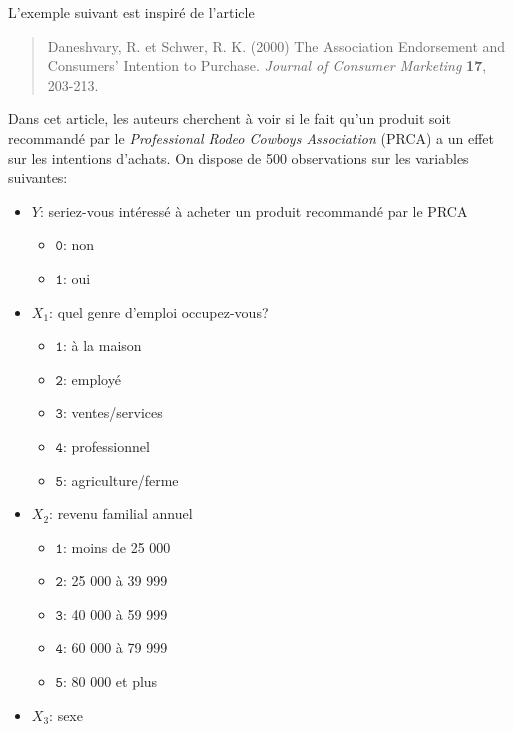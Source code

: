 \documentclass[
  11pt,
  letterpaper,
]{book}
\providecommand{\tightlist}{%
  \setlength{\itemsep}{0pt}\setlength{\parskip}{0pt}}
\theoremstyle{definition}
\theoremstyle{definition}
\theoremstyle{definition}
\theoremstyle{remark}
\begin{document}
L'exemple suivant est inspiré de l'article

\begin{quote}
Daneshvary, R. et Schwer, R. K. (2000) The Association Endorsement and Consumers' Intention to Purchase. \emph{Journal of Consumer Marketing} \textbf{17}, 203-213.
\end{quote}

Dans cet article, les auteurs cherchent à voir si le fait qu'un produit soit recommandé par le \emph{Professional Rodeo Cowboys Association} (PRCA) a un effet sur les intentions d'achats. On dispose de 500 observations sur les variables suivantes:

\begin{itemize}
\tightlist
\item
  \(Y\): seriez-vous intéressé à acheter un produit recommandé par le PRCA

  \begin{itemize}
  \tightlist
  \item
    \(\texttt{0}\): non
  \item
    \(\texttt{1}\): oui
  \end{itemize}
\item
  \(X_1\): quel genre d'emploi occupez-vous?

  \begin{itemize}
  \tightlist
  \item
    \(\texttt{1}\): à la maison
  \item
    \(\texttt{2}\): employé
  \item
    \(\texttt{3}\): ventes/services
  \item
    \(\texttt{4}\): professionnel
  \item
    \(\texttt{5}\): agriculture/ferme
  \end{itemize}
\item
  \(X_2\): revenu familial annuel

  \begin{itemize}
  \tightlist
  \item
    \(\texttt{1}\): moins de 25 000
  \item
    \(\texttt{2}\): 25 000 à 39 999
  \item
    \(\texttt{3}\): 40 000 à 59 999
  \item
    \(\texttt{4}\): 60 000 à 79 999
  \item
    \(\texttt{5}\): 80 000 et plus
  \end{itemize}
\item
  \(X_3\): sexe


\end{itemize}
\end{document}
